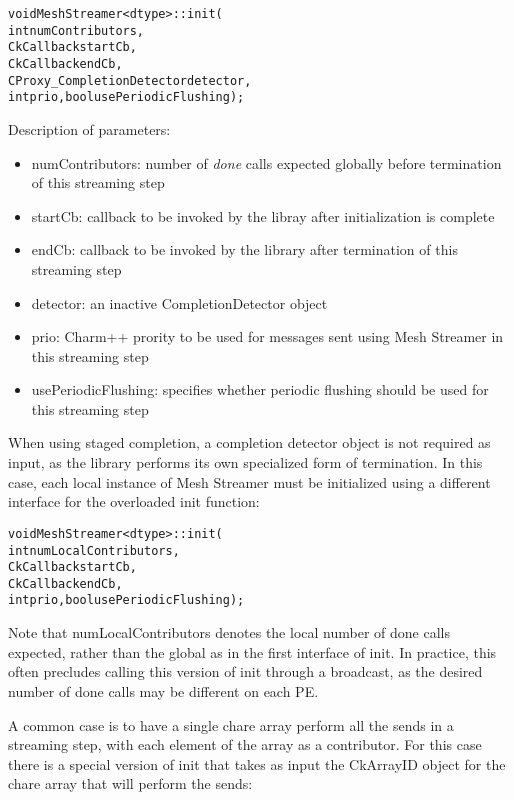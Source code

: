 \begin{alltt}
void MeshStreamer<dtype>::init(
                  int numContributors,
                  CkCallback startCb, 
                  CkCallback endCb, 
                  CProxy_CompletionDetector detector, 
                  int prio, bool usePeriodicFlushing);
\end{alltt}

Description of parameters:

\begin{itemize}
\item numContributors: number of \emph{done} calls expected globally
  before termination of this streaming step
\item startCb: callback to be invoked by the libray after
  initialization is complete
\item endCb: callback to be invoked by the library after termination
  of this streaming step
\item detector: an inactive CompletionDetector object
\item prio: Charm++ prority to be used for messages sent using Mesh
  Streamer in this streaming step
\item usePeriodicFlushing: specifies whether periodic flushing should
  be used for this streaming step
\end{itemize}

When using staged completion, a completion detector object is not
required as input, as the library performs its own specialized form of
termination. In this case, each local instance of Mesh Streamer must
be initialized using a different interface for the overloaded init function: 

\begin{alltt}
void MeshStreamer<dtype>::init(
                  int numLocalContributors, 
                  CkCallback startCb, 
                  CkCallback endCb, 
                  int prio, bool usePeriodicFlushing);
\end{alltt}

Note that numLocalContributors denotes the local number of done calls
expected, rather than the global as in the first interface of init. In
practice, this often precludes calling this version of init through a
broadcast, as the desired number of done calls may be different on
each PE.

A common case is to have a single chare array perform all the sends in
a streaming step, with each element of the array as a contributor. For
this case there is a special version of init that takes as input the
CkArrayID object for the chare array that will perform the sends: 

